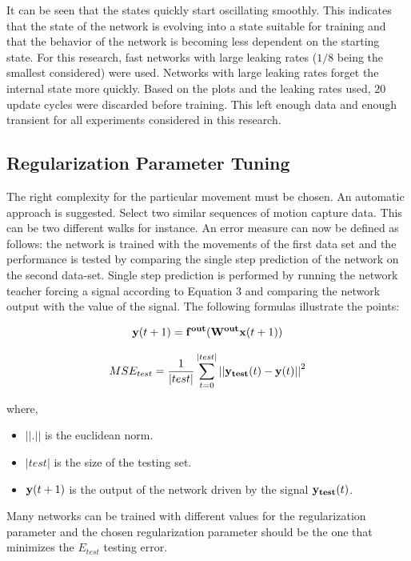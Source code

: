 \documentclass[letterpaper,9pt]{article}
\newcommand{\vectornorm}[1]{\left|\left|#1\right|\right|}
\begin{document}
It can be seen that the states quickly start oscillating smoothly. This indicates that the state of the network is evolving into a state suitable for training and that the behavior of the network is becoming less dependent on the starting state. For this research, fast networks with large leaking rates ($1/8$ being the smallest considered) were used. Networks with large leaking rates forget the internal state more quickly. Based on the plots and the leaking rates used, $20$ update cycles were discarded before training. This left enough data and enough transient for all experiments considered in this research. 

\subsection{Regularization Parameter Tuning}

The right complexity for the particular movement must be chosen. An automatic approach is suggested. Select two similar sequences of motion capture data. This can be two different walks for instance. An error measure can now be defined as follows: the network is trained with the movements of the first data set and the performance is tested by comparing the single step prediction of the network on the second data-set. Single step prediction is performed by running the network teacher forcing a signal according to Equation 3 and comparing the network output with the value of the signal. The following formulas illustrate the points:

\[
{\bf y}(t+1)={\bf f^{out}}({\bf W^{out}x}(t+1))
\]

\begin{equation}
MSE_{test} = \frac{1}{|test|}\sum_{t=0}^{|test|}\vectornorm{{\bf y_{test}}(t) - {\bf y} (t)}^2
\end{equation}

where,
\begin{itemize}
\item $\vectornorm{.}$ is the euclidean norm.
\item $|test|$ is the size of the testing set.
\item ${\bf y}(t+1)$ is the output of the network driven by the signal ${\bf y_{test}}(t)$.
\end{itemize}

Many networks can be trained with different values for the regularization parameter and the chosen regularization parameter should be the one that minimizes the $E_{test}$ testing error.
\end{document}
